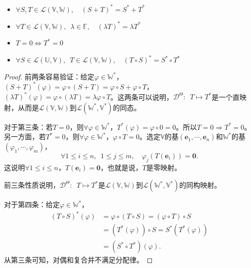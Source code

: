 \documentclass[12pt,UTF8]{ctexbook}
\begin{document}
\begin{pp}\label{pp:3_6}
    \begin{itemize}
        \item $\forall S, T \in \mathcal{L}(\mathbb{V}, \mathbb{W}), \quad (S + T)^* = S^* + T^*$
        \item $\forall T \in \mathcal{L}(\mathbb{V}, \mathbb{W}), \,\,\, \lambda \in \mathbb{F}, \quad (\lambda T)^* = \lambda T^*$
        \item $T=0 \Leftrightarrow T^* = 0$
        \item $\forall S \in \mathcal{L}(\mathbb{U}, \mathbb{V}), \,\,\, T \in \mathcal{L}(\mathbb{V}, \mathbb{W}), \quad (T \circ S)^* = S^* \circ T^*$
    \end{itemize}
\end{pp}
\begin{proof} %
前两条容易验证：给定$ \varphi \in \mathbb{W}^*$，$(S + T)^*(\varphi) = \varphi \circ (S + T) = \varphi \circ S + \varphi \circ T$，$(\lambda T)^*(\varphi) = \varphi \circ (\lambda T) = \lambda \varphi \circ T $。这两条可以说明，$\mathcal{D}^{\Theta}:\,\,\, T \mapsto T^*$是一个直映射，从而是$\mathcal{L}(\mathbb{V}, \mathbb{W})$到$\mathcal{L}(\mathbb{W}^*, \mathbb{V}^*)$的同态。

对于第三条：若$T = 0$，则$\forall \varphi \in \mathbb{W}^*$，$T^*(\varphi) = \varphi \circ 0 = 0$。所以$T=0 \Rightarrow T^* = 0$。另一方面，若$T^* = 0$，则$\forall \varphi \in \mathbb{W}^*$，$\varphi\circ T = 0$。选定$\mathbb{V}$的基$(\mathbf{e}_1, \cdots , \mathbf{e}_n)$和$\mathbb{W}^*$的基$(\varphi_1, \cdots , \varphi_m)$，
$$ \forall 1 \leqslant i \leqslant n, \,\,\,  1 \leqslant j \leqslant m, \quad \varphi_j (T(\mathbf{e}_i)) = \mathbf{0}.$$
这说明$\forall 1 \leqslant i \leqslant n$，$T(\mathbf{e}_i) = \mathbf{0}$，也就是说，$T$是零映射。

前三条性质说明，$\mathcal{D}^{\Theta}:\,\,\, T \mapsto T^*$是$\mathcal{L}(\mathbb{V}, \mathbb{W})$到$\mathcal{L}(\mathbb{W}^*, \mathbb{V}^*)$的同构映射。

对于第四条：给定$ \varphi \in \mathbb{W}^*$，
\begin{align*}
(T \circ S)^* (\varphi) &= \varphi \circ (T \circ S)  = (\varphi \circ T) \circ S  \\
&= (T^*(\varphi)) \circ S  = S^*(T^*(\varphi))  \\
&= (S^*\circ T^*)(\varphi). 
\end{align*}
从第三条可知，对偶和复合并不满足分配律。

\end{proof}
\end{document}
